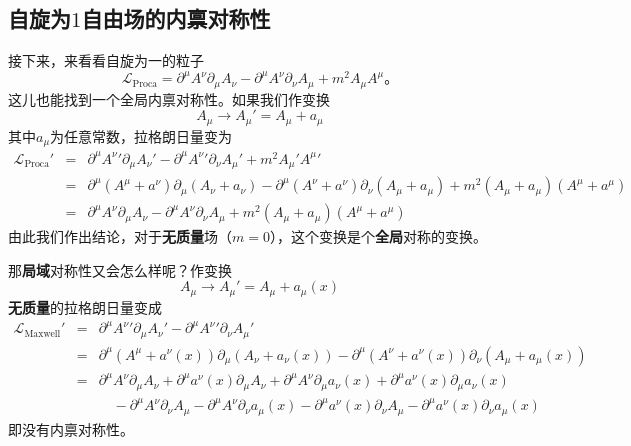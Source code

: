 \subsection{自旋为$1$自由场的内禀对称性}\label{sec7.1.2}
接下来，来看看自旋为一的粒子
\begin{equation}
{\mathscr L}_\text{Proca} = \partial^\mu A^\nu\partial_\mu A_\nu - \partial^\mu A^\nu \partial_\nu A_\mu + m^2A_\mu A^\mu \text{。}
\end{equation}
这儿也能找到一个全局内禀对称性。如果我们作变换
\begin{equation}
A_\mu \rightarrow A_\mu' = A_\mu+a_\mu
\end{equation}
其中$a_\mu$为任意常数，拉格朗日量变为
\begin{eqnarray}
{\mathscr L}_\text{Proca}' &=& \partial^\mu A^\nu'\partial_\mu A_\nu' - \partial^\mu A^\nu' \partial_\nu A_\mu' + m^2A_\mu' A^\mu' \nonumber\\
&=& \partial^\mu (A^\mu+a^\nu)\partial_\mu (A_\nu+a_\nu) - \partial^\mu (A^\nu+a^\nu) \partial_\nu ( A_\mu+a_\mu) + m^2( A_\mu+a_\mu) ( A^\mu+a^\mu) \nonumber\\
&=& \partial^\mu A^\nu\partial_\mu A_\nu - \partial^\mu A^\nu \partial_\nu A_\mu + m^2( A_\mu+a_\mu) ( A^\mu+a^\mu)
\end{eqnarray}
由此我们作出结论，对于{\bf 无质量}场（$m=0$），这个变换是个{\bf 全局}对称的变换。

那{\bf 局域}对称性又会怎么样呢？作变换
\begin{equation}
A_\mu \rightarrow A_\mu' = A_\mu+a_\mu(x)
\end{equation}
{\bf 无质量}的拉格朗日量变成
\begin{eqnarray}
{\mathscr L}_\text{Maxwell}' &=& \partial^\mu A^\nu'\partial_\mu A_\nu' - \partial^\mu A^\nu' \partial_\nu A_\mu' \nonumber\\
&=& \partial^\mu (A^\mu+a^\nu(x))\partial_\mu (A_\nu+a_\nu(x)) - \partial^\mu (A^\nu+a^\nu(x)) \partial_\nu ( A_\mu+a_\mu(x))  \nonumber\\
&=& \partial^\mu A^\nu\partial_\mu A_\nu+\partial^\mu a^\nu(x)\partial_\mu A_\nu+\partial^\mu A^\nu\partial_\mu a_\nu(x) +\partial^\mu a^\nu(x)\partial_\mu a_\nu(x) \nonumber\\
& &\quad - \partial^\mu A^\nu \partial_\nu A_\mu - \partial^\mu A^\nu \partial_\nu a_\mu(x)-\partial^\mu a^\nu(x) \partial_\nu A_\mu - \partial^\mu a^\nu(x) \partial_\nu a_\mu(x)
\end{eqnarray}
即没有内禀对称性。

